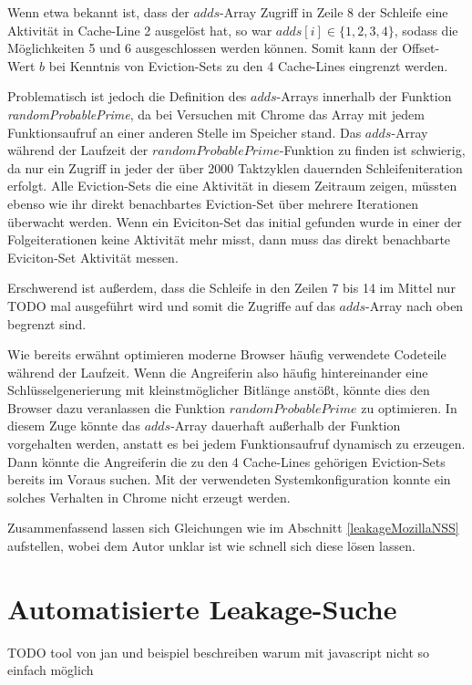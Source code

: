 Wenn etwa bekannt ist, dass der $adds$-Array Zugriff in Zeile 8 der Schleife eine Aktivität in Cache-Line 2 ausgelöst hat, so war $adds[i] \in \{1,2,3,4\}$, sodass die Möglichkeiten 5 und 6 ausgeschlossen werden können.
Somit kann der Offset-Wert $b$ bei Kenntnis von Eviction-Sets zu den 4 Cache-Lines eingrenzt werden.

Problematisch ist jedoch die Definition des $adds$-Arrays innerhalb der Funktion \textit{randomProbablePrime}, da bei Versuchen mit Chrome das Array mit jedem Funktionsaufruf an einer anderen Stelle im Speicher stand.
Das $adds$-Array während der Laufzeit der $randomProbablePrime$-Funktion zu finden ist schwierig, da nur ein Zugriff in jeder der über 2000 Taktzyklen dauernden Schleifeniteration erfolgt.
Alle Eviction-Sets die eine Aktivität in diesem Zeitraum zeigen, müssten ebenso wie ihr direkt benachbartes Eviction-Set über mehrere Iterationen überwacht werden.
Wenn ein Eviciton-Set das initial gefunden wurde in einer der Folgeiterationen keine Aktivität mehr misst, dann muss das direkt benachbarte Eviciton-Set Aktivität messen.

Erschwerend ist außerdem, dass die Schleife in den Zeilen 7 bis 14 im Mittel nur TODO mal ausgeführt wird und somit die Zugriffe auf das $adds$-Array nach oben begrenzt sind.

Wie bereits erwähnt optimieren moderne Browser häufig verwendete Codeteile während der Laufzeit.
Wenn die Angreiferin also häufig hintereinander eine Schlüsselgenerierung mit kleinstmöglicher Bitlänge anstößt, könnte dies den Browser dazu veranlassen die Funktion $randomProbablePrime$ zu optimieren. 
In diesem Zuge könnte das $adds$-Array dauerhaft außerhalb der Funktion vorgehalten werden, anstatt es bei jedem Funktionsaufruf dynamisch zu erzeugen.
Dann könnte die Angreiferin die zu den 4 Cache-Lines gehörigen Eviction-Sets bereits im Voraus suchen.
Mit der verwendeten Systemkonfiguration konnte ein solches Verhalten in Chrome nicht erzeugt werden.

Zusammenfassend lassen sich Gleichungen wie im Abschnitt \ref{leakageMozillaNSS} aufstellen, wobei dem Autor unklar ist wie schnell sich diese lösen lassen.

\section{Automatisierte Leakage-Suche}

TODO tool von jan und beispiel beschreiben
warum mit javascript nicht so einfach möglich


